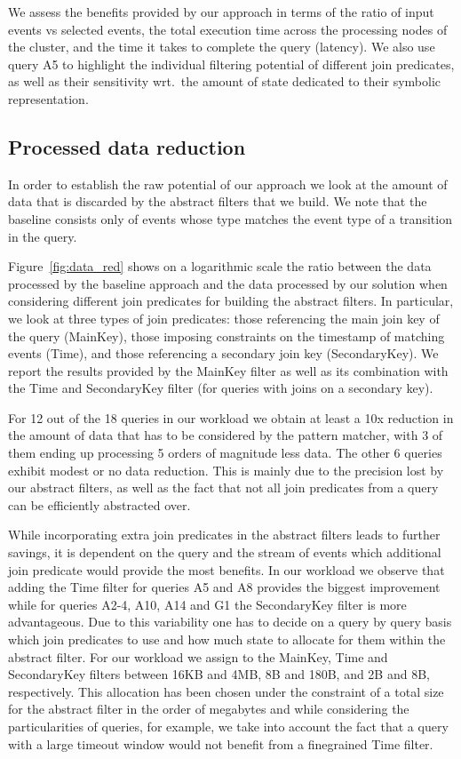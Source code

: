 We assess the benefits provided by our approach in terms of 
the ratio of input events vs selected events, 
the total execution time across the processing nodes of the cluster,
and the time it takes to complete the query (latency).
We also use query A5 to highlight the individual filtering potential
of different join predicates, as well as their sensitivity wrt.\ the amount of
state dedicated to their symbolic representation.



\subsection{Processed data reduction}

In order to establish the raw potential of our approach we look at the amount of
data that is discarded by the abstract filters that we build.
We note that the baseline consists only of events whose type matches the event
type of a transition in the query.

Figure~\ref{fig:data_red} shows on a logarithmic scale the ratio between the
data processed by the baseline approach and the data processed by our solution
when considering different join predicates for building the abstract filters.
In particular, we look at three types of join predicates: those referencing
the main join key of the query (MainKey), those imposing constraints on the
timestamp of matching events (Time), and those referencing a secondary join key
(SecondaryKey).
We report the results provided by the MainKey filter as well as its combination
with the Time and SecondaryKey filter (for queries with joins on a secondary
key).
 
For 12 out of the 18 queries in our workload we obtain at least a 10x reduction
in the amount of data that has to be considered by the pattern matcher, with 3
of them ending up processing 5 orders of magnitude less data.
The other 6 queries exhibit modest or no data reduction. This is mainly due to
the precision lost by our abstract filters, as well as the fact that not all
join predicates from a query can be efficiently abstracted over. 

While incorporating extra join predicates in the abstract filters leads to
further savings, it is dependent on the query and the stream of events which
additional join predicate would provide the most benefits.
In our workload we observe that adding the Time filter for queries A5 and A8 
provides the biggest improvement while for queries A2-4, A10, A14 and G1 the
SecondaryKey filter is more advantageous. 
Due to this variability one has to decide on a query by query basis which join
predicates to use and how much state to allocate for them within the abstract
filter.
For our workload we assign to the MainKey, Time and SecondaryKey filters between
16KB and 4MB, 8B and 180B, and 2B and 8B, respectively.
This allocation has been chosen under the constraint of a total size for the
abstract filter in the order of megabytes and while considering the
particularities of queries, for example, we take into account the fact that a
query with a large timeout window would not benefit from a finegrained Time
filter.




